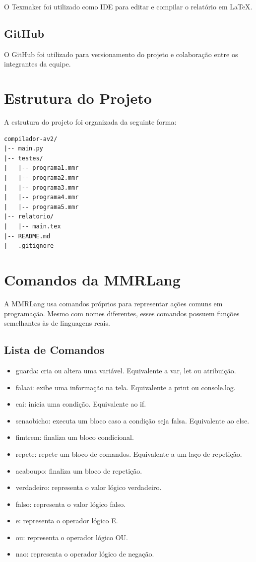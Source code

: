 \documentclass[12pt,a4paper]{article}
\begin{document}
O Texmaker foi utilizado como IDE para editar e compilar o relatório em LaTeX.

\subsection{GitHub}

O GitHub foi utilizado para versionamento do projeto e colaboração entre os integrantes da equipe.

\section{Estrutura do Projeto}

A estrutura do projeto foi organizada da seguinte forma:

\begin{lstlisting}
compilador-av2/
|-- main.py
|-- testes/
|   |-- programa1.mmr
|   |-- programa2.mmr
|   |-- programa3.mmr
|   |-- programa4.mmr
|   |-- programa5.mmr
|-- relatorio/
|   |-- main.tex
|-- README.md
|-- .gitignore
\end{lstlisting}

\section{Comandos da MMRLang}

A MMRLang usa comandos próprios para representar ações comuns em programação. Mesmo com nomes diferentes, esses comandos possuem funções semelhantes às de linguagens reais.

\subsection{Lista de Comandos}

\begin{itemize}
\item guarda: cria ou altera uma variável. Equivalente a var, let ou atribuição.
\item falaai: exibe uma informação na tela. Equivalente a print ou console.log.
\item eai: inicia uma condição. Equivalente ao if.
\item senaobicho: executa um bloco caso a condição seja falsa. Equivalente ao else.
\item fimtrem: finaliza um bloco condicional.
\item repete: repete um bloco de comandos. Equivalente a um laço de repetição.
\item acaboupo: finaliza um bloco de repetição.
\item verdadeiro: representa o valor lógico verdadeiro.
\item falso: representa o valor lógico falso.
\item e: representa o operador lógico E.
\item ou: representa o operador lógico OU.
\item nao: representa o operador lógico de negação.
\end{itemize}
\end{document}

